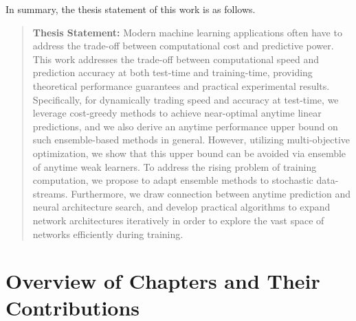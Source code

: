 In summary, the thesis statement of this work is as follows. 
\begin{quotation}
\textbf{Thesis Statement:} 
Modern machine learning applications often have to address the trade-off between computational cost and predictive power. 
This work addresses the trade-off between computational speed and prediction accuracy at both test-time and training-time, providing theoretical performance guarantees and practical experimental results. 
Specifically, for dynamically trading speed and accuracy at test-time, we leverage cost-greedy methods to achieve near-optimal anytime linear predictions, and we 
also derive an anytime performance upper bound on such ensemble-based methods in general. 
However, utilizing multi-objective optimization,
we show that this upper bound can be avoided via ensemble of anytime weak learners.
To address the rising problem of training computation, we propose to adapt ensemble methods to stochastic data-streams. 
Furthermore, we draw connection between anytime prediction and neural architecture search, 
and develop practical algorithms to expand network architectures iteratively in order to explore the vast space of networks efficiently during training. 
\end{quotation}


\section{Overview of Chapters and Their Contributions}


